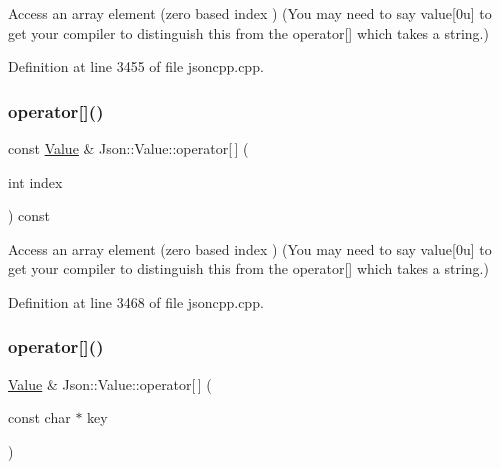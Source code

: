 Access an array element (zero based index ) (You may need to say \textquotesingle{}value\mbox{[}0u\mbox{]}\textquotesingle{} to get your compiler to distinguish this from the operator\mbox{[}\mbox{]} which takes a string.) 

Definition at line 3455 of file jsoncpp.\+cpp.

\hypertarget{class_json_1_1_value_a0b42557a95621a4676b46a21ffc5e949}{}\label{class_json_1_1_value_a0b42557a95621a4676b46a21ffc5e949} 
\subsubsection{\texorpdfstring{operator[]()}{operator[]()}\hspace{0.1cm}{\footnotesize\ttfamily [13/18]}}
{\footnotesize\ttfamily const \hyperlink{class_json_1_1_value}{Value} \& Json\+::\+Value\+::operator\mbox{[}$\,$\mbox{]} (\begin{DoxyParamCaption}\item[{int}]{index }\end{DoxyParamCaption}) const}

Access an array element (zero based index ) (You may need to say \textquotesingle{}value\mbox{[}0u\mbox{]}\textquotesingle{} to get your compiler to distinguish this from the operator\mbox{[}\mbox{]} which takes a string.) 

Definition at line 3468 of file jsoncpp.\+cpp.

\hypertarget{class_json_1_1_value_acb912f4ec40a25ea6eb387730885f3d9}{}\label{class_json_1_1_value_acb912f4ec40a25ea6eb387730885f3d9} 
\subsubsection{\texorpdfstring{operator[]()}{operator[]()}\hspace{0.1cm}{\footnotesize\ttfamily [14/18]}}
{\footnotesize\ttfamily \hyperlink{class_json_1_1_value}{Value} \& Json\+::\+Value\+::operator\mbox{[}$\,$\mbox{]} (\begin{DoxyParamCaption}\item[{const char $\ast$}]{key }\end{DoxyParamCaption})}

